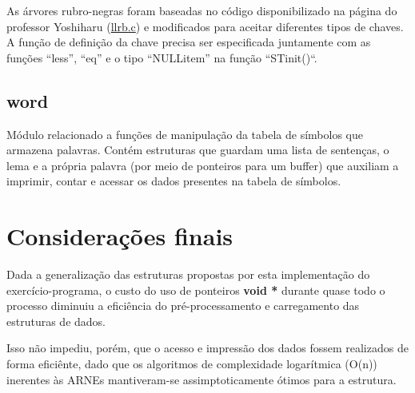 \documentclass[a4paper,12pt]{article}
\begin{document}
        As árvores rubro-negras foram baseadas no código disponibilizado
        na página do professor Yoshiharu
        (\href{http://www.ime.usp.br/~yoshi/2012i/mac323/exx/LLRB.3/llrb.c}{llrb.c})
        e modificados para aceitar diferentes tipos de chaves. A função de 
        definição da chave precisa ser especificada juntamente com as funções ``less'', 
        ``eq'' e o tipo ``NULLitem'' na função ``STinit()``.

    \subsection{word} %
        Módulo relacionado a funções de manipulação da tabela de
        símbolos que armazena palavras. Contém estruturas que guardam
        uma lista de sentenças, o lema e a própria palavra (por meio de 
        ponteiros para um buffer) que auxiliam a imprimir, contar e 
        acessar os dados presentes na tabela de símbolos.

\section{Considerações finais} %
    Dada a generalização das estruturas propostas por esta implementação
    do exercício-programa, o custo do uso de ponteiros \textbf{void *}
    durante quase todo o processo diminuiu a eficiência do
    pré-processamento e carregamento das estruturas de dados.

    Isso não impediu, porém, que o acesso e impressão dos dados fossem
    realizados de forma eficiênte, dado que os algoritmos de
    complexidade logarítmica (O(n)) inerentes às ARNEs mantiveram-se
    assimptoticamente ótimos para a estrutura.
\end{document}
